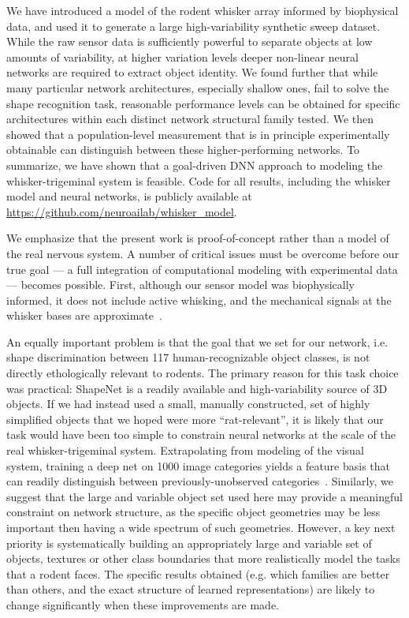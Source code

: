 We have introduced a model of the rodent whisker array informed by biophysical data, and used it to generate a large high-variability synthetic sweep dataset. 
While the raw sensor data is sufficiently powerful to separate objects at low amounts of variability, at higher variation levels deeper non-linear neural networks are required to extract object identity. 
We found further that while many particular network architectures, especially shallow ones, fail to solve the shape recognition task, reasonable performance levels can be obtained for specific architectures within each distinct network structural family tested.
We then showed that a population-level measurement that is in principle experimentally obtainable can distinguish between these higher-performing networks. 
To summarize, we have shown that a goal-driven DNN approach to modeling the whisker-trigeminal system is feasible. 
Code for all results, including the whisker model and neural networks, is publicly available at \url{https://github.com/neuroailab/whisker_model}.

We emphasize that the present work is proof-of-concept rather than a model of the real nervous system.
A number of critical issues must be overcome before our true goal --- a full integration of computational modeling with experimental data --- becomes possible.    
First, although our sensor model was biophysically informed, it does not include active whisking, and the mechanical signals at the whisker bases are approximate~\cite{Quist2014, Huet2016}.

An equally important problem is that the goal that we set for our network, i.e. shape discrimination between 117 human-recognizable object classes, is not directly ethologically relevant to rodents. 
The primary reason for this task choice was practical: ShapeNet is a readily available and high-variability source of 3D objects. 
If we had instead used a small, manually constructed, set of highly simplified objects that we hoped were more ``rat-relevant'', it is likely that our task would have been too simple to constrain neural networks at the scale of the real whisker-trigeminal system. 
Extrapolating from modeling of the visual system, training a deep net on 1000 image categories yields a feature basis that can readily distinguish between previously-unobserved categories~\cite{Yamins2014,cadieu2014deep,razavian2014cnn}.
Similarly, we suggest that the large and variable object set used here may provide a meaningful constraint on network structure, as the specific object geometries may be less important then having a wide spectrum of such geometries. 
However, a key next priority is systematically building an appropriately large and variable set of objects, textures or other class boundaries that more realistically model the tasks that a rodent faces.
The specific results obtained (e.g. which families are better than others, and the exact structure of learned representations) are likely to change significantly when these improvements are made.  

